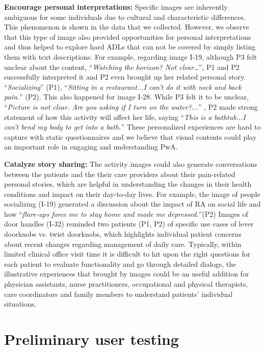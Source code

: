 \documentclass{sig-alternate-05-2015}
\begin{document}
\textbf{Encourage personal interpretations:} Specific images are inherently ambiguous for some individuals due to cultural and characteristic differences. This phenomenon is shown in the data that we collected. However, we observe that this type of image also provided opportunities for personal interpretations and thus helped to explore hard ADLs that can not be covered by simply listing them with text descriptions. For example, regarding image I-19, although P3 felt unclear about the content, ``\textit{Watching the horizon? Not clear…}'', P1 and P2 successfully interpreted it and P2 even brought up her related personal story. ``\textit{Socializing}'' (P1), ``\textit{Sitting in a restaurant...I can't do it with neck and back pain.}'' (P2). This also happened for image I-28. While P3 felt it to be unclear,  ``\textit{Picture is not clear. Are you asking if I turn on the water?...}'' , P2 made strong statement of how this activity will affect her life, saying ``\textit{This is a bathtub...I can't bend my body to get into a bath.}'' These personalized experiences are hard to capture with static questionnaires and we believe that visual contents could play an important role in engaging and understanding PwA.

\textbf{Catalyze story sharing:} The activity images could also generate conversations between the patients and the their care providers about their pain-related personal stories, which are helpful in understanding the changes in their health conditions and impact on their day-to-day lives. For example, the image of people socializing (I-19) generated a discussion about the impact of RA on social life and how ``\textit{flare-ups force me to stay home and made me depressed.}''(P2) Images of door handles (I-32) reminded two patients (P1, P2) of specific use cases of lever doorknobs vs. twist doorknobs, which highlights individual patient concerns about recent changes regarding management of daily care. Typically, within limited clinical office visit time it is difficult to hit upon the right questions for each patient to evaluate functionality and go through detailed dialogs, the illustrative experiences that brought by images could be an useful addition for physician assistants, nurse practitioners, occupational and physical therapists, care coordinators and family members to understand patients' individual situations.
\vspace{-3mm}
\section{Preliminary user testing}
\end{document}
